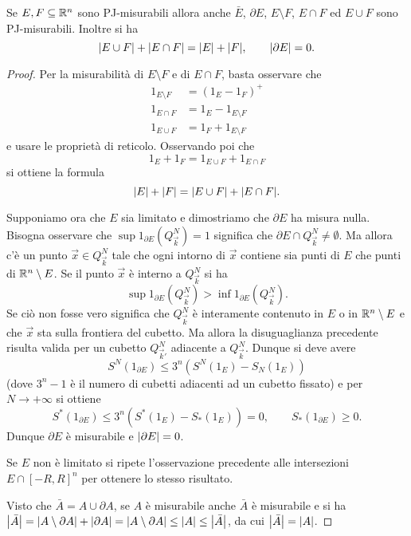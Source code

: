 \begin{theorem}
Se $E,F\subseteq {\mathbb R}^n$ sono PJ-misurabili allora anche $\bar E$, $\partial E$, 
$E\setminus F$, $E\cap F$ ed $E\cup F$ sono PJ-misurabili.
Inoltre si ha 
\[
    {\left|E\cup F\right|} + {\left|E\cap F\right|} = {\left|E\right|} + {\left|F\right|},
    \qquad
    {\left|\partial E\right|} = 0.
\]
\end{theorem}
\begin{proof}
Per la misurabilità di $E\setminus F$ e di $E\cap F$, basta osservare che 
\begin{align*}
  1_{E\setminus F} &= (1_E - 1_F)^+\\
  1_{E\cap F} &= 1_E - 1_{E\setminus F}\\
  1_{E\cup F} &= 1_F + 1_{E\setminus F}
\end{align*}
e usare le proprietà di reticolo.
Osservando poi che 
\[
 1_E + 1_F = 1_{E\cup F} + 1_{E\cap F}
\]
si ottiene la formula
\[
{\left|E\right|} + {\left|F\right|} = {\left|E\cup F\right|} + {\left|E\cap F\right|}.
\]

Supponiamo ora che $E$ sia limitato
e dimostriamo che $\partial E$ ha misura nulla.
Bisogna osservare 
che $\sup 1_{\partial E}(Q^N_{\vec k}) = 1$ 
significa che $\partial E\cap Q^N_{\vec k} \neq \emptyset$.
Ma allora c'è un punto $\vec x\in Q^N_{\vec k}$ tale che ogni intorno 
di $\vec x$ contiene sia punti di $E$ che punti di ${\mathbb R}^n\setminus E$.
Se il punto $\vec x$ è interno a $Q^N_{\vec k}$ si ha
\[
  \sup 1_{\partial E}(Q^N_{\vec k}) > \inf 1_{\partial E}(Q^N_{\vec k}).
\]
Se ciò non fosse vero significa che 
$Q^N_{\vec k}$ è interamente contenuto in $E$ o in ${\mathbb R}^n\setminus E$
e che $\vec x$ sta sulla frontiera del cubetto.
Ma allora la disuguaglianza precedente risulta valida 
per un cubetto $Q^N_{\vec k'}$ adiacente a $Q^N_{\vec k}$.
Dunque si deve avere 
\[
  S^N(1_{\partial E})\le 3^n (S^N(1_E)-S_N(1_E))
\]
(dove $3^n-1$ è il numero di cubetti adiacenti ad un cubetto fissato)
e per $N\to +\infty$ si ottiene 
\[
  S^*(1_{\partial E}) \le 3^n (S^*(1_E)-S_*(1_E)) = 0, 
  \qquad 
  S_*(1_{\partial E})\ge 0.
\]
Dunque $\partial E$ è misurabile e ${\left|\partial E\right|} = 0$.

Se $E$ non è limitato si ripete l'osservazione precedente alle intersezioni 
$E\cap [-R,R]^n$ per ottenere lo stesso risultato.

Visto che $\bar A = A \cup \partial A$, se $A$ è misurabile anche $\bar A$ è 
misurabile e si ha ${\left|\bar A\right|} = {\left|A\setminus \partial A\right|} + {\left|\partial A\right|}
= {\left|A \setminus \partial A\right|} \le {\left|A\right|} \le {\left|\bar A\right|}$,
da cui ${\left|\bar A\right|}={\left|A\right|}$.
\end{proof}

